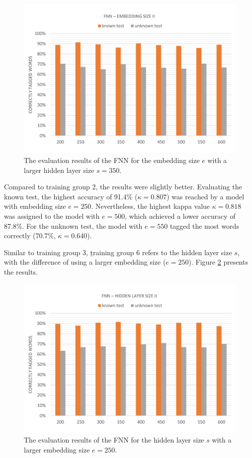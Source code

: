 \begin{figure}[H]
	\hspace{-5mm}\includegraphics[width=1.07\textwidth]{images/evaluation_fnn_e2}
	\caption[FNN Evaluation: Embedding Size II]{The evaluation results of the FNN for the embedding size $e$ with a larger hidden layer size $s=350$.}
	\label{f.evaluation.fnn.e2}
\end{figure}

Compared to training group 2, the results were slightly better. Evaluating the known test, the highest accuracy of 91.4\% ($\kappa=0.807$) was reached by a model with embedding size $e=250$. Nevertheless, the highest kappa value $\kappa=0.818$ was assigned to the model with $e=500$, which achieved a lower accuracy of 87.8\%. For the unknown test, the model with $e=550$ tagged the most words correctly (70.7\%, $\kappa=0.640$).

Similar to training group 3, \b{training group 6} refers to the hidden layer size $s$, with the difference of using a larger embedding size ($e=250$). Figure {\ref{f.evaluation.fnn.s2}} presents the results.

\begin{figure}[H]
	\hspace{-5mm}\includegraphics[width=1.07\textwidth]{images/evaluation_fnn_s2}
	\caption[FNN Evaluation: Hidden Layer Size II]{The evaluation results of the FNN for the hidden layer size $s$ with a larger embedding size $e=250$.}
	\label{f.evaluation.fnn.s2}
\end{figure}

